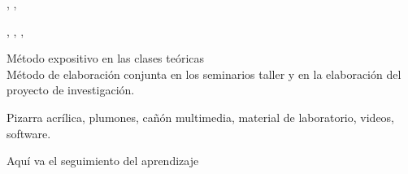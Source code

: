 \documentclass[a4paper,8pt]{article}
\begin{document}
\begin{contenidos}
\cite{whitehorn01}, \cite{date04}, \cite{korth02} 


\nextUnidad{\IMQueryLanguages}
\nextCapitulo{\IMQueryLanguages}
\nextTema{\IMQueryLanguagesTopicOverview}
\nextTema{\IMQueryLanguagesTopicSql}
\nextTema{\IMQueryLanguagesTopicSelections}
\nextTema{\IMQueryLanguagesTopicProjections}
\nextTema{\IMQueryLanguagesTopicSelect}
\nextTema{\IMQueryLanguagesTopicAggregates}
\nextTema{\IMQueryLanguagesTopicSubqueries}
\nextTema{\IMQueryLanguagesTopicQbe}
\nextTema{\IMQueryLanguagesTopicDifferent}
\nextTema{\IMQueryLanguagesTopicIntroduction}
\nextTema{\IMQueryLanguagesTopicStored}

\cite{dietrich01}, \cite{elmasri04}, \cite{celko05}, \cite{korth02} 





\end{contenidos}




\begin{estrategiasEnsenanza}
    \begin{metodos}
        Método expositivo en las clases teóricas \\
        Método de elaboración conjunta en los seminarios taller y en la elaboración del proyecto de investigación.
    \end{metodos}
    \begin{medios}
        Pizarra acrílica, plumones, cañón multimedia, material de laboratorio, videos, software.
    \end{medios}
    \begin{formasOrganizacion}
    \end{formasOrganizacion}
    \begin{programacion}
    \end{programacion}
    \begin{segumientoAprendizaje}
        Aquí va el seguimiento del aprendizaje
    \end{segumientoAprendizaje}
\end{estrategiasEnsenanza}
\end{document}
